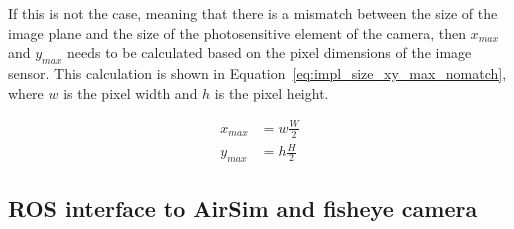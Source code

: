 If this is not the case, meaning that there is a mismatch between the size of the image plane and the size of the photosensitive element of the camera, then $x_{max}$ and $y_{max}$ needs to be calculated based on the pixel dimensions of the image sensor. This calculation is shown in Equation~\eqref{eq:impl_size_xy_max_nomatch}, where $w$ is the pixel width and $h$ is the pixel height.

\begin{equation}
    \begin{aligned}
        x_{max} &= w\frac{W}{2} \\
        y_{max} &= h \frac{H}{2}
    \end{aligned}
    \label{eq:impl_size_xy_max_nomatch}
\end{equation}




        
        

\subsection{ROS interface to AirSim and fisheye camera}\label{subsec:ROS_interface}

